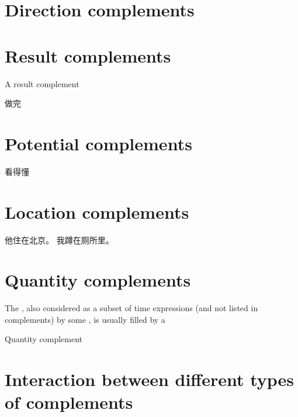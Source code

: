\documentclass[../main.tex]{subfiles}
\begin{document}

\section{Direction complements}\label{sec:direction-complement}

\section{Result complements}\label{sec:result-complement}

A result complement 

做完

\section{Potential complements}\label{sec:potential-complement}

看得懂

\section{Location complements}\label{sec:location-complement}

\begin{exe}
    \begin{xlist}
        \ex 他住在北京。
        \ex 我蹲在厕所里。
    \end{xlist}
\end{exe}

\section{Quantity complements}\label{sec:quantity-complement}

The , also considered as a subset of time expressions (and not listed in complements)
by some \citet[sec. 7.2-7.4]{po2015chinese}, is usually filled by a %

Quantity complement 

\section{Interaction between different types of complements}

\end{document}
